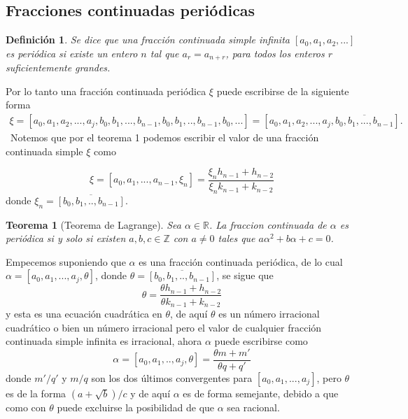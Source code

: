 \documentclass[11pt, article]{article}
\newtheorem{theorem}{Teorema} %
\newtheorem{definition}{Definición}
\begin{document}
    \subsection*{Fracciones continuadas periódicas}
    
    \begin{definition}
    Se dice que una fracción continuada simple infinita $[a_0,a_1,a_2,...]$ es periódica si existe un entero $n$ tal que $a_r=a_{n+r}$, para todos los enteros $r$ suficientemente grandes.
    \end{definition} 
    
    Por lo tanto una fracción continuada periódica $\xi$ puede escribirse de la siguiente forma
        \begin{align*}
         \xi=[a_0,a_1,a_2,...,a_j,b_0,b_1,...,b_{n-1},b_0,b_1,..,b_{n-1},b_{0},...] 
        =[a_0,a_1,a_2,...,a_j,\overline{b_0,b_1,...,b_{n-1}}].
        \end{align*}
        \
        Notemos que por el teorema 1 podemos escribir el valor de una fracción continuada simple $\xi$ como 

    \begin{equation}
    \xi=[a_0,a_1,...,a_{n-1},\xi_n]=\dfrac{\xi_n h_{n-1} + h_{n-2}}{\xi_n k_{n-1} + k_{n-2}}  \label{ecuacion_8}
    \end{equation}
    donde $\xi_n=\overline{[b_0,b_1,..,b_{n-1}]}$.
    

    \begin{theorem}[Teorema de Lagrange] 
        Sea $\alpha \in \mathbb{R}$. La fraccion continuada de $\alpha$ es periódica si y solo si existen $a, b, c \in\mathbb{Z}$ con $a\not=0$ tales que $a\alpha^2 + b\alpha + c = 0$.
    \end{theorem}

    Empecemos suponiendo que $\alpha$ es una fracción continuada periódica, de lo cual $\alpha= [a_0,a_1,...,a_{j},\theta]$, donde $\theta=\overline{[b_0,b_1,..,b_{n-1}]}$, se sigue que
        \[
        \theta =\dfrac{\theta h_{n-1}+h_{n-2}}{\theta k_{n-1}+k_{n-2}}
        \]
    y esta es una ecuación cuadrática en $\theta$, de aquí $\theta$ es un número irracional cuadrático o bien un número irracional pero el valor de cualquier fracción continuada simple infinita es irracional, ahora $\alpha$ puede escribirse como 
        \[
        \alpha = [a_0,a_1,..,a_j,\theta]=\dfrac{\theta m + m'}{\theta q + q'}
        \]
    donde $m'/q'$ y $m/q$ son los dos últimos convergentes para $[a_0,a_1,...,a_j]$, pero $\theta$ es de la forma $(a + \sqrt{b})/c$ y de aquí $\alpha$ es de forma semejante, debido a que como con $\theta$ puede excluirse la posibilidad de que $\alpha$ sea racional.
\end{document}
